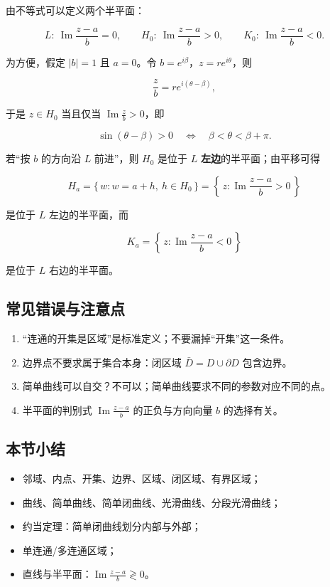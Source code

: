 由不等式可以定义两个半平面：

\[
L:\ \operatorname{Im}\frac{z-a}{b} = 0,
\qquad
H_0:\ \operatorname{Im}\frac{z-a}{b} > 0,
\qquad
K_0:\ \operatorname{Im}\frac{z-a}{b} < 0 .
\]

为方便，假定 \(|b|=1\) 且 \(a=0\)。令
\(b=e^{i\beta}\)，\(z=re^{i\theta}\)，则

\[
\frac{z}{b} = re^{i(\theta-\beta)},
\]

于是 \(z\in H_0\) 当且仅当 \(\operatorname{Im}\frac{z}{b}>0\)，即

\[
\sin(\theta-\beta)>0
\quad\Longleftrightarrow\quad
\beta<\theta<\beta+\pi .
\]

若``按 \(b\) 的方向沿 \(L\) 前进''，则 \(H_0\) 是位于 \(L\)
\textbf{左边}的半平面；由平移可得

\[
H_a = \{\, w : w=a+h,\ h\in H_0\,\} = \left\{\,z : \operatorname{Im}\frac{z-a}{b}>0\,\right\}
\]

是位于 \(L\) 左边的半平面，而

\[
K_a = \left\{\,z : \operatorname{Im}\frac{z-a}{b}<0\,\right\}
\]

是位于 \(L\) 右边的半平面。

\subsection{常见错误与注意点}\label{ux5e38ux89c1ux9519ux8befux4e0eux6ce8ux610fux70b9-1}

\begin{enumerate}
\def\labelenumi{\arabic{enumi}.}
\tightlist
\item
  ``连通的开集是区域''是标准定义；不要漏掉``开集''这一条件。
\item
  边界点不要求属于集合本身：闭区域 \(\bar D=D\cup\partial D\) 包含边界。
\item
  简单曲线可以自交？不可以；简单曲线要求不同的参数对应不同的点。
\item
  半平面的判别式 \(\operatorname{Im}\frac{z-a}{b}\) 的正负与方向向量
  \(b\) 的选择有关。
\end{enumerate}

\subsection{本节小结}\label{ux672cux8282ux5c0fux7ed3-1}

\begin{itemize}
\tightlist
\item
  邻域、内点、开集、边界、区域、闭区域、有界区域；
\item
  曲线、简单曲线、简单闭曲线、光滑曲线、分段光滑曲线；
\item
  约当定理：简单闭曲线划分内部与外部；
\item
  单连通/多连通区域；
\item
  直线与半平面：\(\operatorname{Im}\frac{z-a}{b}\gtrless 0\)。
\end{itemize}

